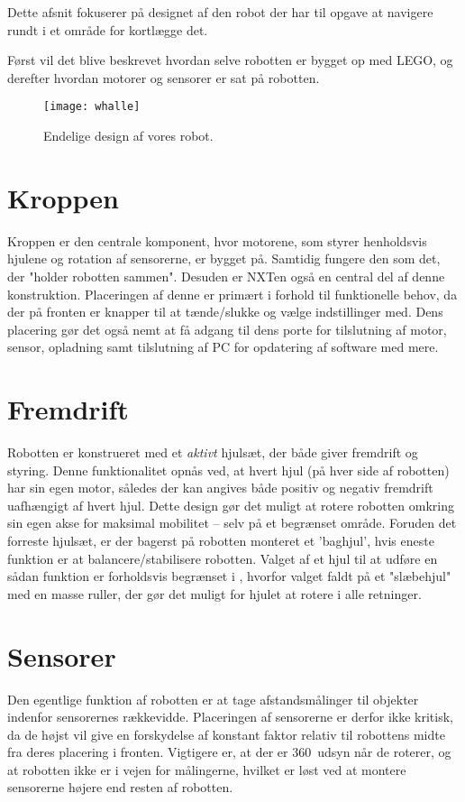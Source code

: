 Dette afsnit fokuserer på designet af den robot der har til opgave at navigere rundt i et område for kortlægge det. 

Først vil det blive beskrevet hvordan selve robotten er bygget op med LEGO, og derefter hvordan motorer og sensorer er sat på robotten.

\begin{figure}
\centering
\texttt{[image: whalle]}
\caption{Endelige design af vores robot.}
\label{robot:opbygning}
\end{figure}




\section{Kroppen}
Kroppen er den centrale komponent, hvor motorene, som styrer henholdsvis hjulene og rotation af sensorerne, er bygget på. 
Samtidig fungere den som det, der "holder robotten sammen".
Desuden er NXTen også en central del af denne konstruktion.
Placeringen af denne er primært i forhold til funktionelle behov, da der på fronten er knapper til at tænde/slukke og vælge indstillinger med.
Dens placering gør det også nemt at få adgang til dens porte for tilslutning af motor, sensor, opladning samt tilslutning af PC for opdatering af software med mere.

\section{Fremdrift}
Robotten er konstrueret med et \textit{aktivt} hjulsæt, der både giver fremdrift og styring.
Denne funktionalitet opnås ved, at hvert hjul (på hver side af robotten) har sin egen motor, således der kan angives både positiv og negativ fremdrift uafhængigt af hvert hjul.
Dette design gør det muligt at rotere robotten omkring sin egen akse for maksimal mobilitet -- selv på et begrænset område.
Foruden det forreste hjulsæt, er der bagerst på robotten monteret et 'baghjul', hvis eneste funktion er at balancere/stabilisere robotten.
Valget af et hjul til at udføre en sådan funktion er forholdsvis begrænset i \lego, hvorfor valget faldt på et "slæbehjul" med en masse ruller, der gør det muligt for hjulet at rotere i alle retninger.

\section{Sensorer}
Den egentlige funktion af robotten er at tage afstandsmålinger til objekter indenfor sensorernes rækkevidde.
Placeringen af sensorerne er derfor ikke kritisk, da de højst vil give en forskydelse af konstant faktor relativ til robottens midte fra deres placering i fronten.
Vigtigere er, at der er 360\degree~udsyn når de roterer, og at robotten ikke er i vejen for målingerne, hvilket er løst ved at montere sensorerne højere end resten af robotten. 

